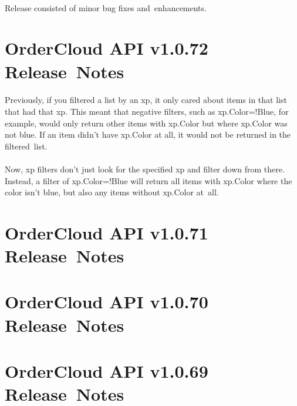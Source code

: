\documentclass{memoir}%
\begin{document}
%
\paragraph*{}%
Release consisted of minor bug fixes and~enhancements.

%
\section*{OrderCloud API v1.0.72 Release~Notes}%
\paragraph*{}%

%
\paragraph*{}%
Previously, if you filtered a list by an xp, it only cared about items in that list that had that xp. This meant that negative filters, such as xp.Color=!Blue, for example, would only return other items with xp.Color but where xp.Color was not blue. If an item didn’t have xp.Color at all, it would not be returned in the filtered~list.

%
\paragraph*{}%
Now, xp filters don’t just look for the specified xp and filter down from there. Instead, a filter of xp.Color=!Blue will return all items with xp.Color where the color isn’t blue, but also any items without xp.Color at~all.

%
\section*{OrderCloud API v1.0.71 Release~Notes}%
\paragraph*{}%

%
\section*{OrderCloud API v1.0.70 Release~Notes}%
\paragraph*{}%

%
\section*{OrderCloud API v1.0.69 Release~Notes}%
\end{document}
